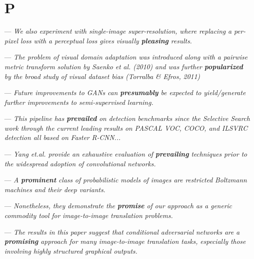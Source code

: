 \section{P}


 --- \textit{We also experiment with single-image super-resolution, where replacing a per-pixel loss with a perceptual loss gives visually \textbf{pleasing} results.}

 --- \textit{The problem of visual domain adaptation was introduced along with a pairwise metric transform solution by Saenko et al. (2010) and was further \textbf{popularized} by the broad study of visual dataset bias (Torralba \& Efros, 2011)}


 --- \textit{Future improvements to GANs can \textbf{presumably} be expected to yield/generate further improvements to semi-supervised learning.}


 --- \textit{This pipeline has  \textbf{prevailed} on detection benchmarks since the Selective Search work through the current leading results on PASCAL VOC, COCO, and ILSVRC detection all based on Faster R-CNN...}


 --- \textit{Yang et.al. provide an exhaustive evaluation of  \textbf{prevailing} techniques prior to the widespread adoption of convolutional networks.}

 --- \textit{A \textbf{prominent} class of probabilistic models of images are restricted Boltzmann machines and their deep variants.}


 --- \textit{Nonetheless, they demonstrate the \textbf{promise} of our approach as a generic commodity tool for image-to-image translation problems.}

 --- \textit{The results in this paper suggest that conditional adversarial networks are a \textbf{promising} approach for many image-to-image translation tasks, especially those involving highly structured graphical outputs.}

